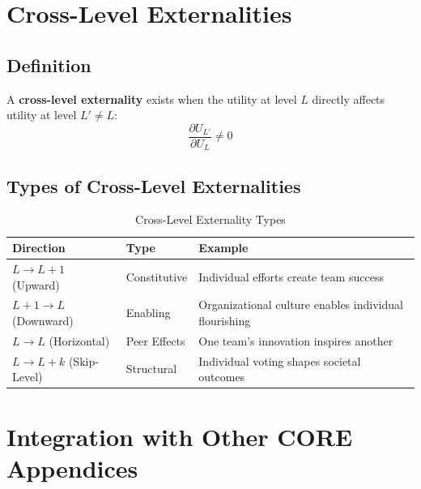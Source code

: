 \section{Cross-Level Externalities}
\label{sec:who-externalities}

\subsection{Definition}

\begin{definition}
A \textbf{cross-level externality} exists when the utility at level $L$ directly affects
utility at level $L' \neq L$:
\begin{equation}
\frac{\partial U_{L'}}{\partial U_L} \neq 0
\end{equation}
\end{definition}

\subsection{Types of Cross-Level Externalities}

\begin{table}[htbp]
\centering
\caption{Cross-Level Externality Types}
\label{tab:who-externalities}
\renewcommand{\arraystretch}{1.3}
\begin{tabular}{@{}lll@{}}
\toprule
\textbf{Direction} & \textbf{Type} & \textbf{Example} \\
\midrule
$L \to L+1$ (Upward) & Constitutive & Individual efforts create team success \\
$L+1 \to L$ (Downward) & Enabling & Organizational culture enables individual flourishing \\
$L \to L$ (Horizontal) & Peer Effects & One team's innovation inspires another \\
$L \to L+k$ (Skip-Level) & Structural & Individual voting shapes societal outcomes \\
\bottomrule
\end{tabular}
\end{table}


\section{Integration with Other CORE Appendices}
\label{sec:who-integration}

